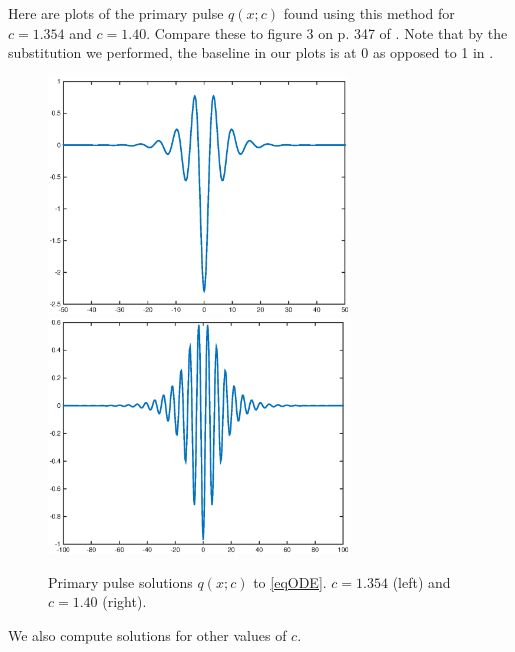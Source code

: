 \documentclass[12pt]{article}
\begin{document}
Here are plots of the primary pulse $q(x; c)$ found using this method for $c = 1.354$ and $c = 1.40$. Compare these to figure 3 on p. 347 of \cite{Chen1997}. Note that by the substitution we performed, the baseline in our plots is at 0 as opposed to 1 in \cite{Chen1997}.

\begin{figure}[H]
\centering
\includegraphics[width=8cm]{single1354.eps}
\includegraphics[width=8cm]{single14.eps}
\label{fig:single1}
\caption{Primary pulse solutions $q(x;c)$ to \eqref{eqODE}. $c = 1.354$ (left) and $c = 1.40$ (right).}
\end{figure}

We also compute solutions for other values of $c$.
\end{document}
